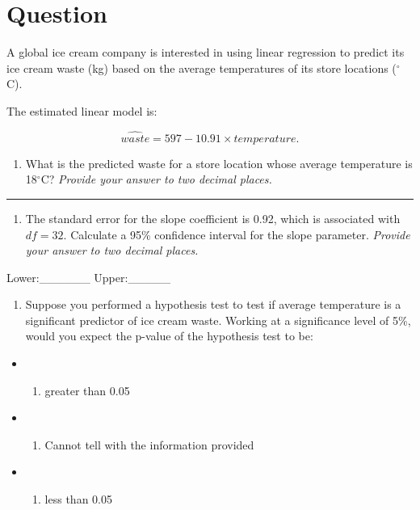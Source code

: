 \documentclass[
]{book}
\providecommand{\tightlist}{%
  \setlength{\itemsep}{0pt}\setlength{\parskip}{0pt}}
\begin{document}
\hypertarget{question}{%
\section{Question}\label{question}}

A global ice cream company is interested in using linear regression to predict its ice cream waste (kg) based on the average temperatures of its store locations (\(^{\circ}\)C).

The estimated linear model is:

\[\hat{waste} = 597 - 10.91 \times temperature.\]

\begin{enumerate}
\def\labelenumi{\arabic{enumi}.}
\tightlist
\item
  What is the predicted waste for a store location whose average temperature is 18\(^{\circ}\)C? \emph{Provide your answer to two decimal places.}
\end{enumerate}

\begin{center}\rule{0.5\linewidth}{0.5pt}\end{center}

\begin{enumerate}
\def\labelenumi{\arabic{enumi}.}
\setcounter{enumi}{1}
\tightlist
\item
  The standard error for the slope coefficient is 0.92, which is associated with \(df=32\). Calculate a 95\% confidence interval for the slope parameter. \emph{Provide your answer to two decimal places.}
\end{enumerate}

Lower:\_\_\_\_\_\_
Upper:\_\_\_\_\_

\begin{enumerate}
\def\labelenumi{\arabic{enumi}.}
\setcounter{enumi}{2}
\tightlist
\item
  Suppose you performed a hypothesis test to test if average temperature is a significant predictor of ice cream waste. Working at a significance level of 5\%, would you expect the p-value of the hypothesis test to be:
\end{enumerate}

\begin{itemize}
\item
  \begin{enumerate}
  \def\labelenumi{(\Alph{enumi})}
  \tightlist
  \item
    greater than 0.05\\
  \end{enumerate}
\item
  \begin{enumerate}
  \def\labelenumi{(\Alph{enumi})}
  \setcounter{enumi}{1}
  \tightlist
  \item
    Cannot tell with the information provided\\
  \end{enumerate}
\item
  \begin{enumerate}
  \def\labelenumi{(\Alph{enumi})}
  \setcounter{enumi}{2}
  \tightlist
  \item
    less than 0.05
  \end{enumerate}
\end{itemize}
\end{document}
